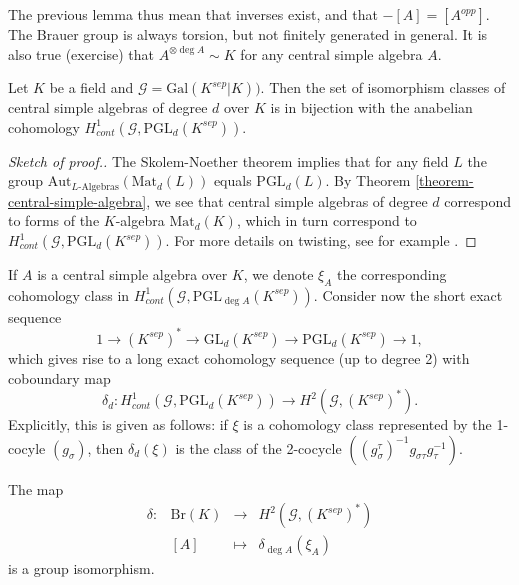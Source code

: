 \noindent
The previous lemma thus mean that inverses exist, and that $-[A] = [A^{opp}]$.
The Brauer group is always torsion, but not finitely generated in general. It
is also true (exercise) that $A^{\otimes \deg A} \sim K$ for any central simple
algebra $A$.

\begin{lemma}
\label{lemma-central-simple-algebra-pgln}
Let $K$ be a field and $\mathcal{G} = \text{Gal} (K^{sep}|K))$. Then the set of
isomorphism classes of central simple algebras of degree $d$ over $K$ is in
bijection with the anabelian cohomology $H_{cont}^1 (\mathcal{G},
\text{PGL}_d(K^{sep}))$.
\end{lemma}

\begin{proof}[Sketch of proof.]
The Skolem-Noether theorem implies that for any field $L$
the group
$\text{Aut}_{L\text{-Algebras}}(\text{Mat}_d(L))$
equals $\text{PGL}_d(L)$. By
Theorem \ref{theorem-central-simple-algebra}, we see that
central simple algebras of degree $d$ correspond
to forms of the $K$-algebra $\text{Mat}_d(K)$, which in turn correspond to
$H_{cont}^1 (\mathcal{G}, \text{PGL}_d(K^{sep}))$. For more details on
twisting, see for example
\cite{SilvermanEllipticCurves}.
\end{proof}

\noindent
If $A$ is a central simple algebra over $K$, we denote $\xi_A$ the
corresponding cohomology class in $H_{cont}^1 (\mathcal{G}, \text{PGL}_{\deg
A}(K^{sep}))$. Consider now the short exact sequence
$$
1 \to (K^{sep})^* \to \text{GL}_d(K^{sep}) \to \text{PGL}_d(K^{sep}) \to 1,
$$
which gives rise to a long exact cohomology sequence (up to degree 2) with
coboundary map
$$
\delta_d : H_{cont} ^1(\mathcal{G}, \text{PGL}_d(K^{sep})) \to H^2
(\mathcal{G}, (K^{sep})^*).
$$
Explicitly, this is given as follows: if $\xi$ is a cohomology class
represented by the 1-cocyle $(g_\sigma)$, then $\delta_d(\xi)$ is the class of
the 2-cocycle $((g_\sigma^\tau)^{-1} g_{\sigma \tau} g_\tau^{-1})$.

\begin{theorem}
\label{theorem-brauer-delta}
The map
$$
\begin{matrix}
\delta : & \text{Br}(K) & \longrightarrow & H^2(\mathcal{G}, (K^{sep})^*) \\
& [A] & \longmapsto & \delta_{\deg A} (\xi_A)
\end{matrix}
$$
is a group isomorphism.
\end{theorem}

